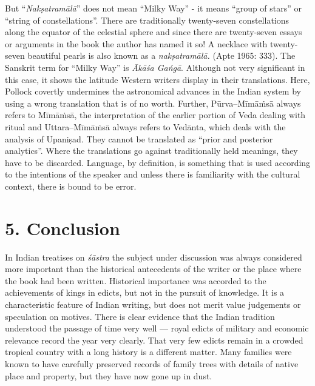 But “\textit{Nakṣatramālā}” does not mean “Milky Way” - it means “group of stars” or “string of constellations”. There are traditionally twenty-seven constellations along the equator of the celestial sphere and since there are twenty-seven essays or arguments in the book the author has named it so! A necklace with twenty-seven beautiful pearls is also known as a \textit{nakṣatramālā.} (Apte 1965: 333). The Sanskrit term for “Milky Way” is \textit{Ākāśa Gańgā}. Although not very significant in this case, it shows the latitude Western writers display in their translations. Here, Pollock covertly undermines the astronomical advances in the Indian system by using a wrong translation that is of no worth. Further, Pūrva--Mīmāṁsā always refers to Mīmāṁsā, the interpretation of the earlier portion of Veda dealing with ritual and Uttara--Mīmāṁsā always refers to Vedānta, which deals with the analysis of Upaniṣad. They cannot be translated as “prior and posterior analytics”. Where the translations go against traditionally held meanings, they have to be discarded. Language, by definition, is something that is used according to the intentions of the speaker and unless there is familiarity with the cultural context, there is bound to be error.


\section*{5. Conclusion}

In Indian treatises on \textit{śāstra} the subject under discussion was always considered more important than the historical antecedents of the writer or the place where the book had been written. Historical importance was accorded to the achievements of kings in edicts, but not in the pursuit of knowledge. It is a characteristic feature of Indian writing, but does not merit value judgements or speculation on motives. There is clear evidence that the Indian tradition understood the passage of time very well --- royal edicts of military and economic relevance record the year very clearly. That very few edicts remain in a crowded tropical country with a long history is a different matter. Many families were known to have carefully preserved records of family trees with details of native place and property, but they have now gone up in dust.

